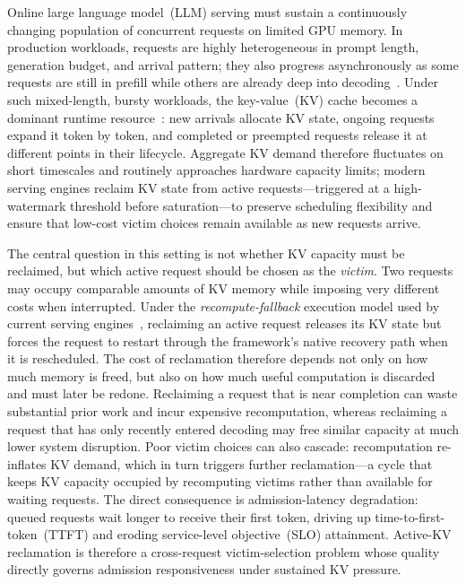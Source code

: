 \documentclass[sigconf,nonacm]{acmart}
\begin{document}
Online large language model~(LLM) serving must sustain a continuously changing
population of concurrent requests on limited GPU memory.  In production
workloads, requests are highly heterogeneous in prompt length, generation
budget, and arrival pattern; they also progress asynchronously as some requests
are still in prefill while others are already deep into
decoding~\cite{Kwon2023, Yu2022, Zheng2024lmsys}.  Under such mixed-length,
bursty workloads, the key-value~(KV) cache becomes a dominant runtime
resource~\cite{Vaswani2017, Pope2022}: new arrivals
allocate KV state, ongoing requests expand it token by token, and completed or
preempted requests release it at different points in their lifecycle.  Aggregate
KV demand therefore fluctuates on short timescales and routinely approaches
hardware capacity limits; modern serving engines reclaim KV state from active
requests---triggered at a high-watermark threshold before saturation---to
preserve scheduling flexibility and ensure that low-cost victim choices remain
available as new requests arrive.

The central question in this setting is not whether KV capacity must be
reclaimed, but which active request should be chosen as the \emph{victim}.
Two requests may occupy comparable amounts of KV memory while imposing very
different costs when interrupted.  Under the \emph{recompute-fallback}
execution model used by current serving engines~\cite{Kwon2023}, reclaiming an
active request releases its KV state but forces the request to restart through
the framework's native recovery path when it is rescheduled.  The cost of reclamation therefore
depends not only on how much memory is freed, but also on how much useful
computation is discarded and must later be redone.  Reclaiming a request that is
near completion can waste substantial prior work and incur expensive
recomputation, whereas reclaiming a request that has only recently entered
decoding may free similar capacity at much lower system disruption.  Poor victim
choices can also cascade: recomputation re-inflates KV demand, which in turn
triggers further reclamation---a cycle that keeps KV capacity occupied by
recomputing victims rather than available for waiting requests.  The direct
consequence is admission-latency degradation: queued requests wait longer to
receive their first token, driving up time-to-first-token~(TTFT) and eroding
service-level objective~(SLO) attainment.  Active-KV reclamation is therefore a
cross-request victim-selection problem whose quality directly governs admission
responsiveness under sustained KV pressure.
\end{document}

